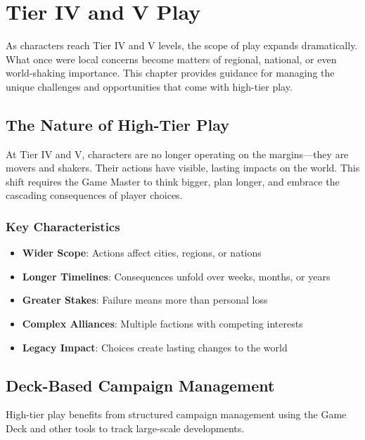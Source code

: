 \chapter{Tier IV and V Play}

As characters reach Tier IV and V levels, the scope of play expands dramatically. What once were local concerns become matters of regional, national, or even world-shaking importance. This chapter provides guidance for managing the unique challenges and opportunities that come with high-tier play.

\section{The Nature of High-Tier Play}

At Tier IV and V, characters are no longer operating on the margins---they are movers and shakers. Their actions have visible, lasting impacts on the world. This shift requires the Game Master to think bigger, plan longer, and embrace the cascading consequences of player choices.

\subsection*{Key Characteristics}

\begin{itemize}
    \item \textbf{Wider Scope}: Actions affect cities, regions, or nations
    \item \textbf{Longer Timelines}: Consequences unfold over weeks, months, or years
    \item \textbf{Greater Stakes}: Failure means more than personal loss
    \item \textbf{Complex Alliances}: Multiple factions with competing interests
    \item \textbf{Legacy Impact}: Choices create lasting changes to the world
\end{itemize}

\section{Deck-Based Campaign Management}

High-tier play benefits from structured campaign management using the Game Deck and other tools to track large-scale developments.

